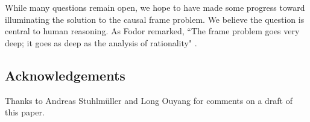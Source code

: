 \documentclass[10pt,letterpaper]{article}
\begin{document}
%
%
%

While many questions remain open, we hope to have made some progress toward illuminating the solution to the causal frame problem. 
We believe the question is central to human reasoning. As Fodor remarked, ``The frame problem goes very deep; it goes as deep as the analysis of rationality" \citeyearpar{Fodor1987}.


\subsection{Acknowledgements} Thanks to Andreas Stuhlm\"{u}ller and Long Ouyang for comments on a draft of this paper.




\end{document}
